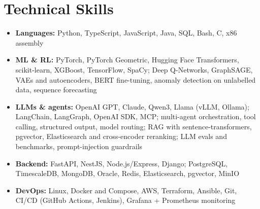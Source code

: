 \documentclass[10pt,a4paper]{article}
\begin{document}
\section*{Technical Skills}
\begin{itemize}
  \item \textbf{Languages:} Python, TypeScript, JavaScript, Java, SQL, Bash, C, x86 assembly
  \item \textbf{ML \& RL:} PyTorch, PyTorch Geometric, Hugging Face Transformers, scikit-learn, XGBoost, TensorFlow, SpaCy; Deep Q-Networks, GraphSAGE, VAEs and autoencoders, BERT fine-tuning, anomaly detection on unlabelled data, sequence forecasting
  \item \textbf{LLMs \& agents:} OpenAI GPT, Claude, Qwen3, Llama (vLLM, Ollama); LangChain, LangGraph, OpenAI SDK, MCP; multi-agent orchestration, tool calling, structured output, model routing; RAG with sentence-transformers, pgvector, Elasticsearch and cross-encoder reranking; LLM evals and benchmarks, prompt-injection guardrails
  \item \textbf{Backend:} FastAPI, NestJS, Node.js/Express, Django; PostgreSQL, TimescaleDB, MongoDB, Oracle, Redis, Elasticsearch, pgvector, MinIO
  \item \textbf{DevOps:} Linux, Docker and Compose, AWS, Terraform, Ansible, Git, CI/CD (GitHub Actions, Jenkins), Grafana + Prometheus monitoring
\end{itemize}
\end{document}
